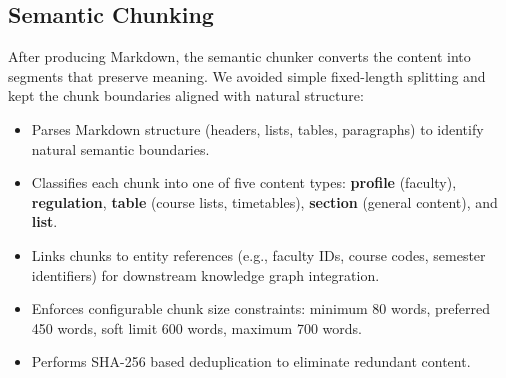 \documentclass[12pt,a4paper]{report}
\begin{document}
\subsection{Semantic Chunking}

After producing Markdown, the semantic chunker converts the content into segments that preserve meaning. We avoided simple fixed-length splitting and kept the chunk boundaries aligned with natural structure:

\begin{itemize}
  \item Parses Markdown structure (headers, lists, tables, paragraphs) to identify natural semantic boundaries.
  \item Classifies each chunk into one of five content types: \textbf{profile} (faculty), \textbf{regulation}, \textbf{table} (course lists, timetables), \textbf{section} (general content), and \textbf{list}.
  \item Links chunks to entity references (e.g., faculty IDs, course codes, semester identifiers) for downstream knowledge graph integration.
  \item Enforces configurable chunk size constraints: minimum 80 words, preferred 450 words, soft limit 600 words, maximum 700 words.
  \item Performs SHA-256 based deduplication to eliminate redundant content.
\end{itemize}
\end{document}
